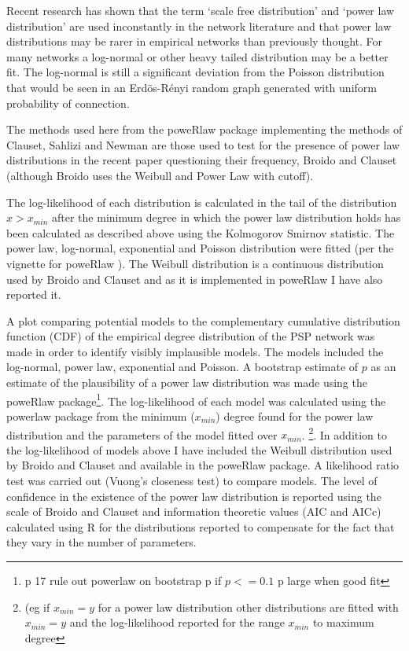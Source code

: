 Recent research has shown that the term `scale free distribution' and `power law distribution' are used inconstantly in the network literature and that power law distributions may be rarer in empirical networks than previously thought. For many networks a log-normal or other heavy tailed distribution may be a better fit\cite{broido2019scale}. The log-normal is still a significant deviation from the Poisson distribution that would be seen in an Erd{\"o}s-R{\'e}nyi random graph generated with uniform probability of connection. 


The methods used here from the poweRlaw package\cite{gillespie2015fitting} implementing the methods of Clauset, Sahlizi and Newman \cite{clauset2009power} are those used to test for the presence of power law distributions in the recent paper questioning their frequency, Broido and Clauset \cite{broido2019scale} (although Broido uses the Weibull and Power Law with cutoff).

The log-likelihood of each distribution is calculated in the tail of the distribution $x>x_{min}$ after the minimum degree in which the power law distribution holds has been calculated as described above using the Kolmogorov Smirnov statistic\cite{clauset2009power}. The power law, log-normal, exponential and Poisson distribution were fitted (per the vignette for poweRlaw \cite{gillespie2015fitting}). The Weibull distribution is a continuous distribution used by Broido and Clauset \cite{broido2019scale} and as it is implemented in poweRlaw I have also reported it. 

A plot comparing potential models to the complementary cumulative distribution function (CDF) of the empirical degree distribution of the PSP network was made in order to identify visibly implausible models. The models included the log-normal, power law, exponential and Poisson. A bootstrap estimate of $p$ as an estimate of the plausibility of a power law distribution was made using the poweRlaw package\footnote{p 17 rule out powerlaw on bootstrap p if $p<=0.1$ p large when good fit}. The log-likelihood of each model was calculated using the powerlaw package from the minimum ($x_{min}$) degree found for the power law distribution and the parameters of the model fitted over $x_{min}$. \footnote{(eg if $x_{min}=y$ for a power law distribution other distributions are fitted with $x_{min}=y$  and the log-likelihood reported for the range $x_{min}$ to maximum degree}. In addition to the log-likelihood of models above I have included the Weibull distribution used by Broido and Clauset and available in the poweRlaw package. A likelihood ratio test was carried out (Vuong's closeness test) to compare models\cite{vuong1989likelihood}. The level of confidence in the existence of the power law distribution is reported using the scale of Broido and Clauset \cite{broido2019scale} and information theoretic values (AIC and AICc) calculated using R for the distributions reported to compensate for the fact that they vary in the number of parameters.


